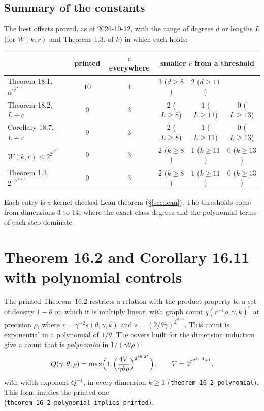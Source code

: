 \documentclass[11pt]{article}
\theoremstyle{definition}
\theoremstyle{remark}
\newcommand{\lean}[1]{\texttt{#1}}
\begin{document}
\subsection*{Summary of the constants}
The best offsets proved, as of 2026-10-12, with the range of degrees $d$ or
lengths $L$ (for $W(k,r)$ and Theorem~1.3, of $k$) in which each holds:
\begin{center}\small
\begin{tabular}{lccccc}
\toprule
& printed & $c$ everywhere & \multicolumn{3}{c}{smaller $c$ from a threshold}\\
\midrule
Theorem 18.1, $\alpha^{2^{2^{d+c}}}$ & $10$ & $4$ & $3$ ($d\ge8$) & $2$ ($d\ge11$) & \\
Theorem 18.2, $L+c$ & $9$ & $3$ & $2$ ($L\ge8$) & $1$ ($L\ge11$) & $0$ ($L\ge13$)\\
Corollary 18.7, $L+c$ & $9$ & $3$ & $2$ ($L\ge8$) & $1$ ($L\ge11$) & $0$ ($L\ge13$)\\
$W(k,r)\le2^{2^{r^{2^{2^{k+c}}}}}$ & $9$ & $3$ & $2$ ($k\ge8$) & $1$ ($k\ge11$) & $0$ ($k\ge13$)\\
Theorem 1.3, $2^{-2^{k+c}}$ & $9$ & $3$ & $2$ ($k\ge8$) & $1$ ($k\ge11$) & $0$ ($k\ge13$)\\
\bottomrule
\end{tabular}
\end{center}
Each entry is a kernel-checked Lean theorem (\S\ref{sec:lean}). The thresholds
come from dimensions $3$ to $14$, where the exact class degrees and the
polynomial terms of each step dominate.

\section{Theorem 16.2 and Corollary 16.11 with polynomial controls}

The printed Theorem~16.2 restricts a relation with the product property to a
set of density $1-\theta$ on which it is multiply linear, with graph count
$q(r^{-1}\rho,\gamma,k)^r$ at precision $\rho$, where
$r=\gamma^{-2}s(\theta,\gamma,k)$ and $s=(2/\theta\gamma)^{2^{2^{k+6}}}$. This
count is exponential in a polynomial of $1/\theta$. The covers built for the
dimension induction give a count that is \emph{polynomial} in $1/(\gamma\theta\rho)$:
\[
  Q(\gamma,\theta,\rho)=\max\Bigl(1,\Bigl(\frac{4V}{\gamma\theta\rho}\Bigr)^{2^{68\cdot2^k}}\Bigr),
  \qquad V=2^{2^{2^{k+4}+1}},
\]
with width exponent $Q^{-1}$, in every dimension $k\ge1$
(\lean{theorem\_16\_2\_polynomial}). This form implies the printed one
(\lean{theorem\_16\_2\_polynomial\_implies\_printed}).
\end{document}
